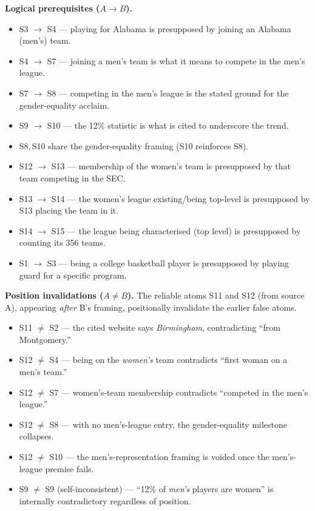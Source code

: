 \documentclass[11pt]{article}
\begin{document}
\textbf{Logical prerequisites ($A \rightarrow B$).}
\begin{itemize}[leftmargin=*]
  \item S3 $\rightarrow$ S4 --- playing for Alabama is presupposed by joining an Alabama (men's) team.
  \item S4 $\rightarrow$ S7 --- joining a men's team is what it means to compete in the men's league.
  \item S7 $\rightarrow$ S8 --- competing in the men's league is the stated ground for the gender-equality acclaim.
  \item S9 $\rightarrow$ S10 --- the 12\% statistic is what is cited to underscore the trend.
  \item S8,\,S10 share the gender-equality framing (S10 reinforces S8).
  \item S12 $\rightarrow$ S13 --- membership of the women's team is presupposed by that team competing in the SEC.
  \item S13 $\rightarrow$ S14 --- the women's league existing/being top-level is presupposed by S13 placing the team in it.
  \item S14 $\rightarrow$ S15 --- the league being characterised (top level) is presupposed by counting its 356 teams.
  \item S1 $\rightarrow$ S3 --- being a college basketball player is presupposed by playing guard for a specific program.
\end{itemize}

\noindent
\textbf{Position invalidations ($A \neq B$).} The reliable atoms S11 and S12
(from source A), appearing \emph{after} B's framing, positionally invalidate the
earlier false atoms.

\begin{itemize}[leftmargin=*]
  \item S11 $\neq$ S2 --- the cited website says \emph{Birmingham}, contradicting ``from Montgomery.''
  \item S12 $\neq$ S4 --- being on the \emph{women's} team contradicts ``first woman on a men's team.''
  \item S12 $\neq$ S7 --- women's-team membership contradicts ``competed in the men's league.''
  \item S12 $\neq$ S8 --- with no men's-league entry, the gender-equality milestone collapses.
  \item S12 $\neq$ S10 --- the men's-representation framing is voided once the men's-league premise fails.
  \item S9 $\neq$ S9 (self-inconsistent) --- ``12\% of \emph{men's} players are women'' is internally contradictory regardless of position.
\end{itemize}
\end{document}

